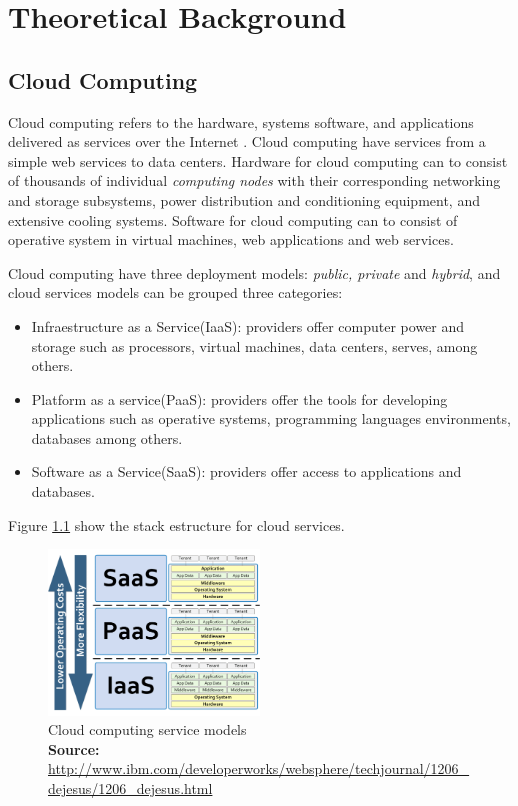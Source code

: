 \chapter{Theoretical Background}

\section{Cloud Computing}
Cloud computing refers to the hardware, systems software, and applications delivered as services over the Internet \cite{cloud}. Cloud computing have services from a simple web services to data centers. Hardware for cloud computing can to consist of thousands of individual \emph{computing nodes} with their corresponding networking and storage subsystems, power distribution and conditioning equipment, and extensive cooling systems. Software for cloud computing can to consist of operative system in virtual machines, web applications and web services. 

Cloud computing have three deployment models: \emph{public, private} and \emph{hybrid}, and cloud services models can be grouped three categories:
\begin{itemize}
  \item Infraestructure as a Service(IaaS): providers offer computer power and   storage such as processors, virtual machines, data centers, serves, among others.
  \item Platform as a service(PaaS): providers offer the tools for developing applications such as operative systems, programming languages environments, databases among others.
  \item Software as a Service(SaaS): providers offer access to applications and databases.
\end{itemize}  

Figure \ref{cloud_services} show the stack estructure for cloud services.

\begin{figure}[!h]
\centering
\includegraphics[width=0.5\textwidth]{images/cloud_services}
\caption[Cloud computing service models]{Cloud computing service models \\
\scriptsize{\textbf{Source:} \url{http://www.ibm.com/developerworks/websphere/techjournal/1206_dejesus/1206_dejesus.html}}}
\label{cloud_services}
\end{figure}

